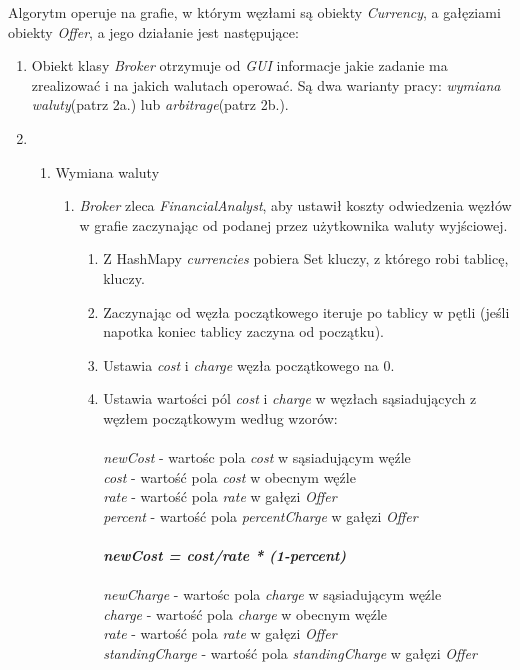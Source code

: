 \documentclass[a4paper,11pt]{article}
\begin{document}
Algorytm operuje na grafie, w którym węzłami są obiekty \textit{Currency}, a gałęziami obiekty \textit{Offer}, a jego działanie jest następujące:
\begin{enumerate}

\item Obiekt klasy \textit{Broker} otrzymuje od \textit{GUI} informacje jakie zadanie ma zrealizować i na jakich walutach operować. Są dwa warianty pracy: \textit{wymiana waluty}(patrz 2a.) lub \textit{arbitrage}(patrz 2b.).
\item
\begin{enumerate}
\item Wymiana waluty

\begin{enumerate}
\item \textit{Broker} zleca \textit{FinancialAnalyst}, aby ustawił koszty odwiedzenia węzłów w grafie zaczynając od podanej przez użytkownika waluty wyjściowej.
\begin{enumerate}
\item Z HashMapy \textit{currencies} pobiera Set kluczy, z którego robi tablicę, kluczy.
\item Zaczynając od węzła początkowego iteruje po tablicy w pętli (jeśli napotka koniec tablicy zaczyna od początku).
\item Ustawia \textit{cost} i \textit{charge} węzła początkowego na 0.
\item Ustawia wartości pól \textit{cost} i \textit{charge} w węzłach sąsiadujących z węzłem początkowym według wzorów:
\\
\\\textit{newCost} - wartośc pola \textit{cost} w sąsiadującym węźle
\\ \textit{cost} - wartość pola \textit{cost} w obecnym węźle
\\ \textit{rate} - wartość pola \textit{rate} w gałęzi \textit{Offer}
\\ \textit{percent} - wartość pola \textit{percentCharge} w gałęzi \textit{Offer}
\\
\\ \textbf{\emph{newCost = cost/rate * (1-percent)}}
\\
\\\textit{newCharge} - wartośc pola \textit{charge} w sąsiadującym węźle
\\ \textit{charge} - wartość pola \textit{charge} w obecnym węźle
\\ \textit{rate} - wartość pola \textit{rate} w gałęzi \textit{Offer}
\\ \textit{standingCharge} - wartość pola \textit{standingCharge} w gałęzi \textit{Offer}

\end{enumerate}
\end{enumerate}
\end{enumerate}
\end{enumerate}
\end{document}

